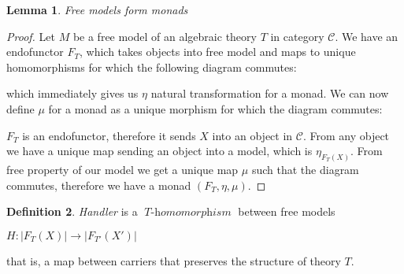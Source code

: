 \documentclass[declaration,shortabstract]{iithesis}
\theoremstyle{definition} \newtheorem{definition}{Definition}[chapter]
\theoremstyle{remark} \newtheorem{remark}[definition]{Observation}
\theoremstyle{plain} \newtheorem{theorem}[definition]{Theorem}
\theoremstyle{plain} \newtheorem{lemma}[definition]{Lemma}
\newcommand{\mathVar}[1]{{\operatorname{\mathit{#1}}}}
\begin{document}
    \begin{lemma}{Free models form monads}
    \end{lemma}
    \begin{proof}
        Let $M$ be a free model of an algebraic theory $T$ in category $\mathcal{C}$. We
        have an endofunctor $ F_{T}$, which takes objects into free model and
        maps to unique homomorphisms for which the following diagram commutes:

        \begin{center}
        \end{center}

        \noindent
        which immediately gives us $\eta$ natural transformation for a monad.
        We can now define $\mu{}$ for a monad as a unique morphism for which
        the diagram commutes:

        \begin{center}
        \end{center}

        \noindent
        $F_{T}$ is an endofunctor, therefore it sends $X$ into an object in $\mathcal{C}$.
        From any object we have a unique map sending an object into a model,
        which is $\eta_{F_{T} (X)}$. From free property of our model we get
        a unique map $\mu{}$ such that the diagram commutes, therefore we have
        a monad $(F_{T}, \eta{}, \mu{})$.

    \end{proof}


    \begin{definition} \textit{Handler} is a $\mathVar{T-homomorphism}$ between
    free models

        \begin{center}
        $ H : {| F_{T} (X) |} \rightarrow {| F_{T'} (X') |} $
        \end{center}

    \noindent
    that is, a map between carriers that preserves the structure of theory $T$.

    \end{definition}
\end{document}
